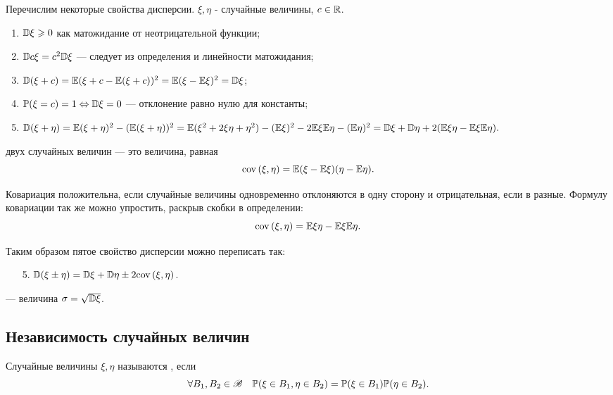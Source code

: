 \documentclass[../TV&MS.tex]{subfiles}
\begin{document}
Перечислим некоторые свойства дисперсии. $\xi,\eta$ - случайные величины, $c \in \mathbb{R}$.

\begin{enumerate}
	\item $\mathbb{D}\xi \geqslant 0$ как матожидание от неотрицательной функции;
	\item $\mathbb{D} c\xi = c^2 \mathbb{D}\xi$ --- следует из определения и линейности матожидания;
	\item $\mathbb{D}(\xi+c) = \mathbb{E}(\xi + c - \mathbb{E}(\xi + c))^2 = \mathbb{E}(\xi - \mathbb{E}\xi)^2 = \mathbb{D}\xi$;
	\item $\mathbb{P}(\xi = c) = 1 \Leftrightarrow \mathbb{D}\xi = 0$ --- отклонение равно нулю для константы;
	\item $\mathbb{D}(\xi + \eta) = \mathbb{E}(\xi+\eta)^2 - (\mathbb{E}(\xi+\eta))^2 = 
	\mathbb{E}(\xi^2+2\xi\eta + \eta^2) - (\mathbb{E}\xi)^2- 2\mathbb{E}\xi\mathbb{E}\eta - (\mathbb{E}\eta)^2 = 
	\mathbb{D}\xi + \mathbb{D}\eta + 2(\mathbb{E}\xi\eta - \mathbb{E}\xi\mathbb{E}\eta).$
\end{enumerate}

\begin{Def}
	 двух случайных величин --- это величина, равная
	$$ {\rm cov \,}(\xi,\eta) = \mathbb{E}(\xi - \mathbb{E}\xi)(\eta - \mathbb{E}\eta).$$
\end{Def}

	Ковариация положительна, если случайные величины одновременно отклоняются в одну 
	сторону и отрицательная, если в разные. Формулу ковариации так же можно упростить, 
	раскрыв скобки в определении:
	$${\rm cov \,}(\xi,\eta) = \mathbb{E}\xi\eta - \mathbb{E}\xi\mathbb{E}\eta.$$

	Таким образом пятое свойство дисперсии можно переписать так:
\begin{itemize}
	\item[5.] $\mathbb{D}(\xi \pm \eta) = \mathbb{D}\xi + \mathbb{D}\eta \pm 2{\rm cov \,}(\xi,\eta)$.
\end{itemize}

\begin{Def}
	 --- величина $\sigma = \sqrt{\mathbb{D}\xi}$.
\end{Def}

    
\subsection{Независимость случайных величин}
\begin{Def}
	Случайные величины $\xi, \eta$ называются , если 
	 $$ \forall B_1, B_2 \in \mathscr{B} \quad \mathbb{P}(\xi \in B_1, \eta \in B_2) 
	 = \mathbb{P}(\xi \in B_1)\mathbb{P}(\eta \in B_2).$$
\end{Def}
\end{document}
